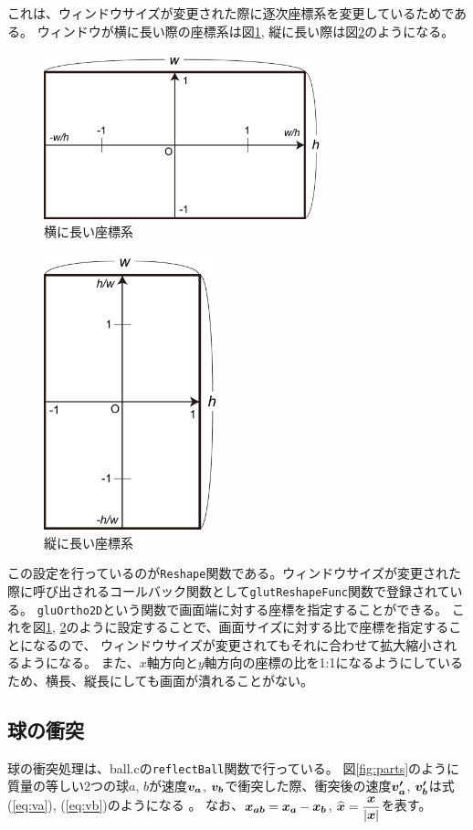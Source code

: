 \documentclass[a4j,titlepage]{jsarticle}
\newcommand{\bvec}[1]{\mbox{\boldmath $#1$}}
\begin{document}
これは、ウィンドウサイズが変更された際に逐次座標系を変更しているためである。
ウィンドウが横に長い際の座標系は図\ref{fig:frame1}, 縦に長い際は図\ref{fig:frame2}のようになる。

\begin{figure}[H]
  \centering
  \includegraphics[width=8cm]{座標系1.pdf}
  \caption{横に長い座標系}
  \label{fig:frame1}
\end{figure}

\begin{figure}[H]
  \centering
  \includegraphics[width=5cm]{座標系2.pdf}
  \caption{縦に長い座標系}
  \label{fig:frame2}
\end{figure}

この設定を行っているのが\texttt{Reshape}関数である。ウィンドウサイズが変更された際に呼び出されるコールバック関数として\texttt{glutReshapeFunc}関数で登録されている。
\texttt{gluOrtho2D}という関数で画面端に対する座標を指定することができる。
これを図\ref{fig:frame1}, \ref{fig:frame2}のように設定することで、画面サイズに対する比で座標を指定することになるので、
ウィンドウサイズが変更されてもそれに合わせて拡大縮小されるようになる。
また、$x$軸方向と$y$軸方向の座標の比を1:1になるようにしているため、横長、縦長にしても画面が潰れることがない。

\subsection{球の衝突}
球の衝突処理は、ball.cの\texttt{reflectBall}関数で行っている。
図\ref{fig:parts}のように質量の等しい2つの球$a$, $b$が速度$\bvec{v_a}$, $\bvec{v_b}$で衝突した際、衝突後の速度$\bvec{v_a'}$, $\bvec{v_b'}$は式(\ref{eq:va}), (\ref{eq:vb})のようになる \cite{bib:2}。
なお、$\bvec{x_{ab}} = \bvec{x_a} - \bvec{x_b}$, $\widehat{\bvec{x}} = \dfrac{\bvec{x}}{| \bvec{x} |}$を表す。
\end{document}
